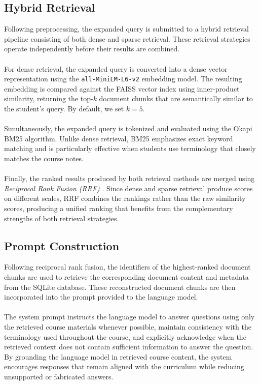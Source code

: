 \documentclass[12pt, a4paper]{report}
\begin{document}
\subsection{Hybrid Retrieval}
Following preprocessing, the expanded query is submitted to a hybrid retrieval pipeline consisting of both dense and sparse retrieval. These retrieval strategies operate independently before their results are combined.~\\~\\
For dense retrieval, the expanded query is converted into a dense vector representation using the \texttt{all-MiniLM-L6-v2} embedding model. The resulting embedding is compared against the FAISS vector index using inner-product similarity, returning the top-$k$ document chunks that are semantically similar to the student's query. By default, we set $k = 5$.~\\~\\
Simultaneously, the expanded query is tokenized and evaluated using the Okapi BM25 algorithm. Unlike dense retrieval, BM25 emphasizes exact keyword matching and is particularly effective when students use terminology that closely matches the course notes.~\\~\\
Finally, the ranked results produced by both retrieval methods are merged using \textit{Reciprocal Rank Fusion (RRF)} \cite{agarwal25}. Since dense and sparse retrieval produce scores on different scales, RRF combines the rankings rather than the raw similarity scores, producing a unified ranking that benefits from the complementary strengths of both retrieval strategies.
\subsection{Prompt Construction}
Following reciprocal rank fusion, the identifiers of the highest-ranked document chunks are used to retrieve the corresponding document content and metadata from the SQLite database. These reconstructed document chunks are then incorporated into the prompt provided to the language model.~\\~\\
The system prompt instructs the language model to answer questions using only the retrieved course materials whenever possible, maintain consistency with the terminology used throughout the course, and explicitly acknowledge when the retrieved context does not contain sufficient information to answer the question. By grounding the language model in retrieved course content, the system encourages responses that remain aligned with the curriculum while reducing unsupported or fabricated answers.
\end{document}
